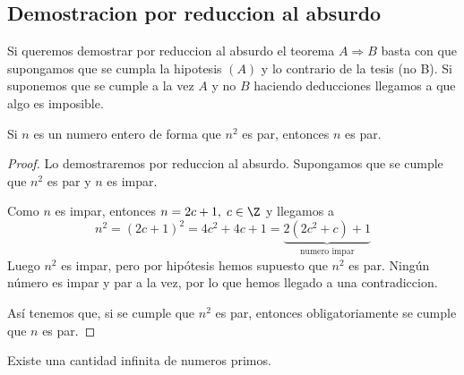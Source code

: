 \subsection{Demostracion por reduccion al absurdo}

Si queremos demostrar por reduccion al absurdo el teorema \(A \Rightarrow B \) basta con que supongamos que se cumpla la hipotesis \((A)\) y lo contrario de la tesis (no B). Si suponemos que se cumple a la vez \(A \) y no \(B\) haciendo deducciones llegamos a que algo es imposible.

\begin{theorem}
	Si \(n \) es un numero entero de forma que \(n^{2} \) es par, entonces \(n \) es par.
\end{theorem}
\begin{proof}
	Lo demostraremos por reduccion al absurdo. Supongamos que se cumple que \(n^{2} \) es par y \(n \) es impar.

	Como \(n \) es impar, entonces \(n = 2c + 1, \; c \in \Z\) y llegamos a
	\[
		n^{2} = (2c+1)^{2} = 4c^{2} + 4c + 1 = \underbrace{2(2c^{2} + c) + 1}_{\text{numero impar} }
	\]
	Luego \(n^{2} \) es impar, pero por hipótesis hemos supuesto que \(n^{2 } \) es par. Ningún número es impar y par a la vez, por lo que hemos llegado a una contradiccion.

	Así tenemos que, si se cumple que \(n^{2} \) es par, entonces obligatoriamente se cumple que \(n \) es par.
\end{proof}

\begin{theorem}
	\label{infinitosprimos}
	Existe una cantidad infinita de numeros primos.
\end{theorem}

